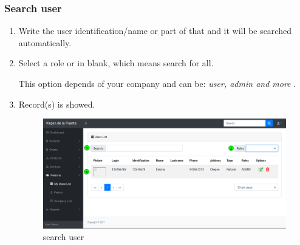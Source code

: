 \documentclass[a4paper,11pt]{refart}
\begin{document}
\subsubsection{Search user}\label{section:user_search}
\begin{enumerate}
	\item Write the user identification/name or part of that and it will be searched automatically.
	\item Select a role or in blank, which means search for all.
		\medskip
		\begin{leftbar}
			This option depends of your company and can be: \emph{user, admin and more} .
		\end{leftbar}
	\item Record(s) is showed.
	\begin{figure}[H]\centering
		\includegraphics[width=\textwidth]{images/user_list-search.png}
		\caption{search user}
		\label{fig:user_list-search.png}
	\end{figure}
\end{enumerate}
\end{document}
